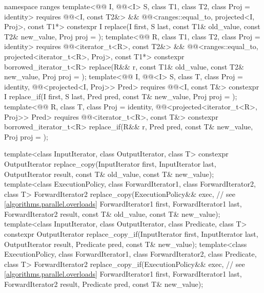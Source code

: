\begin{codeblock}
{  namespace ranges {
    template<@@ I, @@<I> S, class T1, class T2, class Proj = identity>
      requires @@<I, const T2&> &&
               @@<ranges::equal_to, projected<I, Proj>, const T1*>
      constexpr I
        replace(I first, S last, const T1& old_value, const T2& new_value, Proj proj = {});
    template<@@ R, class T1, class T2, class Proj = identity>
      requires @@<iterator_t<R>, const T2&> &&
               @@<ranges::equal_to,
                                         projected<iterator_t<R>, Proj>, const T1*>
      constexpr borrowed_iterator_t<R>
        replace(R&& r, const T1& old_value, const T2& new_value, Proj proj = {});
    template<@@ I, @@<I> S, class T, class Proj = identity,
             @@<projected<I, Proj>> Pred>
      requires @@<I, const T&>
      constexpr I replace_if(I first, S last, Pred pred, const T& new_value, Proj proj = {});
    template<@@ R, class T, class Proj = identity,
             @@<projected<iterator_t<R>, Proj>> Pred>
      requires @@<iterator_t<R>, const T&>
      constexpr borrowed_iterator_t<R>
        replace_if(R&& r, Pred pred, const T& new_value, Proj proj = {});
  }

  template<class InputIterator, class OutputIterator, class T>
    constexpr OutputIterator replace_copy(InputIterator first, InputIterator last,
                                          OutputIterator result,
                                          const T& old_value, const T& new_value);
  template<class ExecutionPolicy, class ForwardIterator1, class ForwardIterator2, class T>
    ForwardIterator2 replace_copy(ExecutionPolicy&& exec,       // see \ref{algorithms.parallel.overloads}
                                  ForwardIterator1 first, ForwardIterator1 last,
                                  ForwardIterator2 result,
                                  const T& old_value, const T& new_value);
  template<class InputIterator, class OutputIterator, class Predicate, class T>
    constexpr OutputIterator replace_copy_if(InputIterator first, InputIterator last,
                                             OutputIterator result,
                                             Predicate pred, const T& new_value);
  template<class ExecutionPolicy, class ForwardIterator1, class ForwardIterator2,
           class Predicate, class T>
    ForwardIterator2 replace_copy_if(ExecutionPolicy&& exec,    // see \ref{algorithms.parallel.overloads}
                                     ForwardIterator1 first, ForwardIterator1 last,
                                     ForwardIterator2 result,
                                     Predicate pred, const T& new_value);

}
\end{codeblock}
